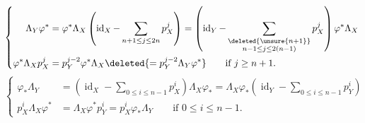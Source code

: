 \[
\left\{\begin{aligned}
\Lambda_Y\varphi^*&=\varphi^*\Lambda_X\left(\operatorname{id}_X-\sum_{n+1\leq j\leq2n}p_X^j\right)
=\left(\operatorname{id}_Y-\sum_{\substack{\deleted{\unsure{n+1}}\\n-1\leq j\leq2(n-1)}}p_X^j\right)\varphi^*\Lambda_X\\
\varphi^*\Lambda_Xp_X^j&=p_Y^{j-2}\varphi^*\Lambda_X\deleted{=p_Y^{j-2}\Lambda_Y\varphi^*}
\qquad\text{if }j\geq n+1.
\end{aligned}\right.
\]
\[
\left\{\begin{aligned}
\varphi_*\Lambda_Y&=\left(\operatorname{id}_X-\sum_{0\leq i\leq n-1}p_X^i\right)\Lambda_X\varphi_*
=\Lambda_X\varphi_*\left(\operatorname{id}_Y-\sum_{0\leq i\leq n-1}p_Y^i\right)\\
p_X^i\Lambda_X\varphi^*&=\Lambda_X\varphi^*p_Y^i=p_X^i\varphi_*\Lambda_Y\qquad\text{if }0\leq i\leq n-1.
\end{aligned}\right.
\]
